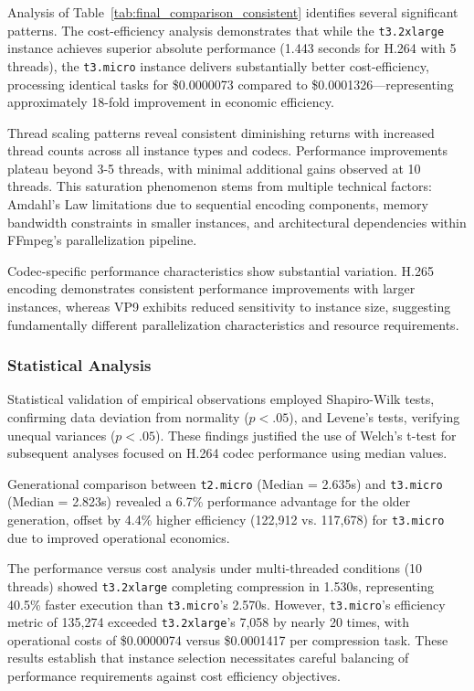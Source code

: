 \documentclass[conference]{IEEEtran}
\begin{document}
	Analysis of Table~\ref{tab:final_comparison_consistent} identifies several significant patterns. The cost-efficiency analysis demonstrates that while the \texttt{t3.2xlarge} instance achieves superior absolute performance (1.443 seconds for H.264 with 5 threads), the \texttt{t3.micro} instance delivers substantially better cost-efficiency, processing identical tasks for \$0.0000073 compared to \$0.0001326—representing approximately 18-fold improvement in economic efficiency.
	
	Thread scaling patterns reveal consistent diminishing returns with increased thread counts across all instance types and codecs. Performance improvements plateau beyond 3-5 threads, with minimal additional gains observed at 10 threads. This saturation phenomenon stems from multiple technical factors: Amdahl's Law limitations due to sequential encoding components, memory bandwidth constraints in smaller instances, and architectural dependencies within FFmpeg's parallelization pipeline.
	
	Codec-specific performance characteristics show substantial variation. H.265 encoding demonstrates consistent performance improvements with larger instances, whereas VP9 exhibits reduced sensitivity to instance size, suggesting fundamentally different parallelization characteristics and resource requirements.
	
	\subsubsection{Statistical Analysis}
	
	Statistical validation of empirical observations employed Shapiro-Wilk tests, confirming data deviation from normality ($p < .05$), and Levene's tests, verifying unequal variances ($p < .05$). These findings justified the use of Welch's t-test for subsequent analyses focused on H.264 codec performance using median values.
	
	Generational comparison between \texttt{t2.micro} (Median = 2.635s) and \texttt{t3.micro} (Median = 2.823s) revealed a 6.7\% performance advantage for the older generation, offset by 4.4\% higher efficiency (122,912 vs. 117,678) for \texttt{t3.micro} due to improved operational economics.
	
	The performance versus cost analysis under multi-threaded conditions (10 threads) showed \texttt{t3.2xlarge} completing compression in 1.530s, representing 40.5\% faster execution than \texttt{t3.micro}'s 2.570s. However, \texttt{t3.micro}'s efficiency metric of 135,274 exceeded \texttt{t3.2xlarge}'s 7,058 by nearly 20 times, with operational costs of \$0.0000074 versus \$0.0001417 per compression task. These results establish that instance selection necessitates careful balancing of performance requirements against cost efficiency objectives.
	
\end{document}
